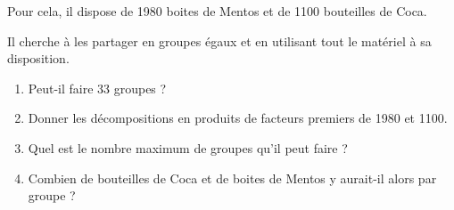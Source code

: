 Pour cela, il dispose de 1980 boites de Mentos et de 1100 bouteilles de Coca.

Il cherche à les partager en groupes égaux et en utilisant tout le matériel à sa disposition.

\begin{enumerate}
    \item Peut-il faire 33 groupes ?
    \item Donner les décompositions en produits de facteurs premiers de 1980 et 1100.
    \item Quel est le nombre maximum de groupes qu'il peut faire ?
    \item Combien de bouteilles de Coca et de boites de Mentos y aurait-il alors par groupe ?
\end{enumerate}

